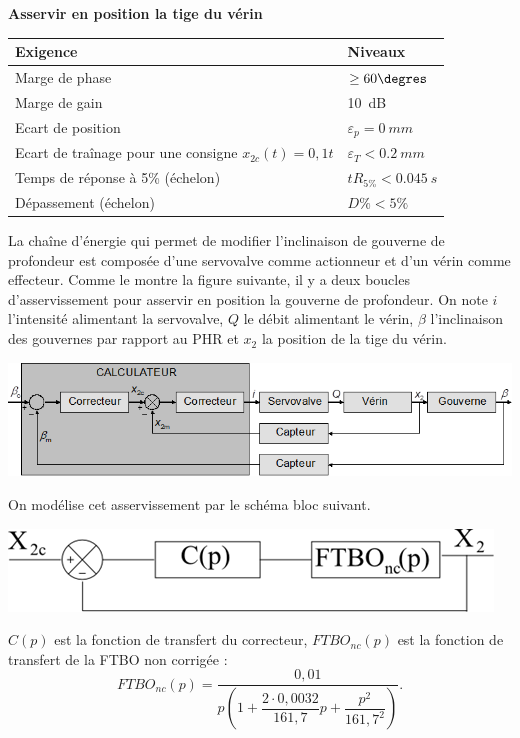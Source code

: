 \documentclass[10pt,fleqn]{article} %
\begin{document}
\begin{multicols}{2}
\begin{center}
\textbf{Asservir en position la tige du vérin }
\begin{tabular}{|p{.45\linewidth}|p{.45\linewidth}|}
\hline
 Exigence	& Niveaux \\ \hline\hline
 Marge de phase	 & $\geq 60\degres $\\ \hline
 Marge de gain	 & \SI{10}{dB} \\ \hline
 Ecart de position&	$\varepsilon_p=\SI{0}{mm}$\\ \hline
 Ecart de traînage pour une consigne $x_{2c} (t)=0,1 t $ & $\varepsilon_T<\SI{0.2}{mm}$\\ \hline
 Temps de réponse à 5\% (échelon)& $tR_{5\%}< \SI{0.045}{s}$ \\ \hline
 Dépassement (échelon)	& $D\%< 5\%$\\ \hline
\end{tabular}
\end{center}

La chaîne d’énergie qui permet de modifier l’inclinaison de gouverne de profondeur est composée d’une servovalve comme actionneur et d’un vérin comme effecteur. Comme le montre la figure suivante, il y a deux boucles d’asservissement pour asservir en position la gouverne de profondeur. On note $i$ l'intensité alimentant la servovalve, $Q$ le débit alimentant le vérin, $\beta$ l'inclinaison des gouvernes par rapport au PHR et $x_2$ la position de la tige du vérin.
 



\begin{center}
\includegraphics[width=\linewidth]{images/fig_03}
\end{center}


On modélise cet asservissement par le schéma bloc suivant.
\begin{center}
\includegraphics[width=\linewidth]{images/fig_04}
\end{center}
$C(p)$ est la fonction de transfert du correcteur, $FTBO_{nc}(p)$ est la fonction de transfert de la FTBO non corrigée : 
$$
FTBO_{nc}(p)=\dfrac{0,01}{p\left(1+\dfrac{2\cdot 0,0032}{161,7}p + \dfrac{p^2}{161,7^2} \right)}.
$$


\end{multicols}
\end{document}
